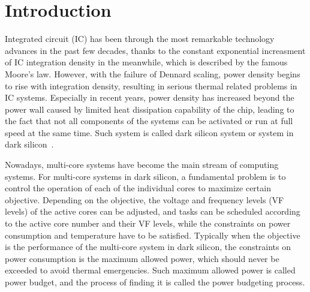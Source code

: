 \section{Introduction}

Integrated circuit (IC) has been through the most remarkable technology advances in the past few decades, thanks to the constant exponential increasment of IC integration density in the meanwhile, which is described by the famous Moore's law. However, with the failure of Dennard scaling, power density begins to rise with integration density, resulting in serious thermal related problems in IC systems. Especially in recent years, power density has increased beyond the power wall caused by limited heat dissipation capability of the chip, leading to the fact that not all components of the systems can be activated or run at full speed at the same time. Such system is called dark silicon system or system in dark silicon~\cite{Hardavellas:MICRO'11,Goulding-Hotta:MICRO'11,Esmaeilzadeh:MICRO'12,Taylor:DAC'12,Taylor:MICRO'13,WangMa:TODAES'16}.

Nowadays, multi-core systems have become the main stream of computing systems. For multi-core systems in dark silicon, a fundamental problem is to control the operation of each of the individual cores to maximize certain objective. Depending on the objective, the voltage and frequency levels (VF levels) of the active cores can be adjusted, and tasks can be scheduled according to the active core number and their VF levels, while the constraints on power consumption and temperature have to be satisfied. Typically when the objective is the performance of the multi-core system in dark silicon, the constraints on power consumption is the maximum allowed power, which should never be exceeded to avoid thermal emergencies. Such maximum allowed power is called power budget, and the process of finding it is called the power budgeting process. 

